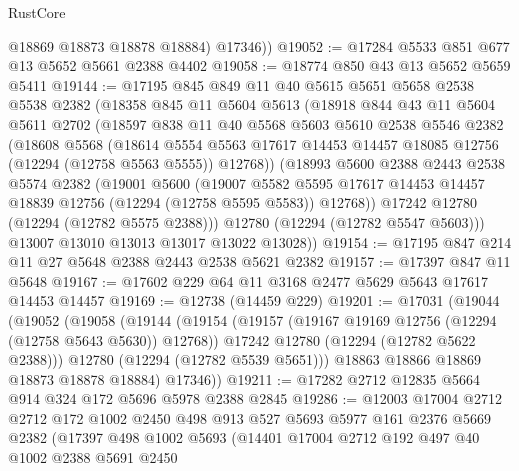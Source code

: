 \begin{lexlean}{RustCore}
\begin{coremodule}
          @18869
          @18873
          @18878
          @18884)
        @17346))
@19052 := @17284 @5533 @851 @677 @13 @5652 @5661 @2388 @4402
@19058 := @18774 @850 @43 @13 @5652 @5659 @5411
@19144 := @17195
    @845
    @849
    @11
    @40
    @5615
    @5651
    @5658
    @2538
    @5538
    @2382
    (@18358
      @845
      @11
      @5604
      @5613
      (@18918
        @844
        @43
        @11
        @5604
        @5611
        @2702
        (@18597
          @838
          @11
          @40
          @5568
          @5603
          @5610
          @2538
          @5546
          @2382
          (@18608
            @5568
            (@18614
              @5554
              @5563
              @17617
              @14453
              @14457
              @18085
              @12756
              (@12294 (@12758 @5563 @5555))
              @12768))
          (@18993
            @5600
            @2388
            @2443
            @2538
            @5574
            @2382
            (@19001
              @5600
              (@19007
                @5582
                @5595
                @17617
                @14453
                @14457
                @18839
                @12756
                (@12294 (@12758 @5595 @5583))
                @12768))
            @17242
            @12780
            (@12294 (@12782 @5575 @2388)))
          @12780
          (@12294 (@12782 @5547 @5603)))
        @13007
        @13010
        @13013
        @13017
        @13022
        @13028))
@19154 := @17195 @847 @214 @11 @27 @5648 @2388 @2443 @2538 @5621 @2382
@19157 := @17397 @847 @11 @5648
@19167 := @17602 @229 @64 @11 @3168 @2477 @5629 @5643 @17617 @14453 @14457
@19169 := @12738 (@14459 @229)
@19201 := @17031
    (@19044
      (@19052
        (@19058
          (@19144
            (@19154
              (@19157 (@19167 @19169 @12756 (@12294 (@12758 @5643 @5630)) @12768))
              @17242
              @12780
              (@12294 (@12782 @5622 @2388)))
            @12780
            (@12294 (@12782 @5539 @5651)))
          @18863
          @18866
          @18869
          @18873
          @18878
          @18884)
        @17346))
@19211 := @17282 @2712 @12835 @5664 @914 @324 @172 @5696 @5978 @2388 @2845
@19286 := @12003
    @17004
    @2712
    @2712
    @172
    @1002
    @2450
    @498
    @913
    @527
    @5693
    @5977
    @161
    @2376
    @5669
    @2382
    (@17397
      @498
      @1002
      @5693
      (@14401
        @17004
        @2712
        @192
        @497
        @40
        @1002
        @2388
        @5691
        @2450

\end{coremodule}
\end{lexlean}
